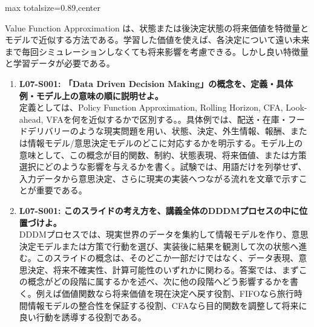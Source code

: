 \begin{minipage}[t]{0.58\textwidth}
\begin{adjustbox}{max totalsize={\textwidth}{0.89\textheight},center}
\begin{minipage}{\textwidth}
Value Function Approximation は、状態または後決定状態の将来価値を特徴量とモデルで近似する方法である。学習した価値を使えば、各決定について遠い未来まで毎回シミュレーションしなくても将来影響を考慮できる。しかし良い特徴量と学習データが必要である。\par{}\begin{enumerate}\item \textbf{L07-S001: 「Data Driven Decision Making」の概念を、定義・具体例・モデル上の意味の順に説明せよ。}\\定義としては、Policy Function Approximation, Rolling Horizon, CFA, Look-ahead, VFAを何を近似するかで区別する。。具体例では、配送・在庫・フードデリバリーのような現実問題を用い、状態、決定、外生情報、報酬、または情報モデル/意思決定モデルのどこに対応するかを明示する。モデル上の意味として、この概念が目的関数、制約、状態表現、将来価値、または方策選択にどのような影響を与えるかを書く。試験では、用語だけを列挙せず、入力データから意思決定、さらに現実の実装へつながる流れを文章で示すことが重要である。\item \textbf{L07-S001: このスライドの考え方を、講義全体のDDDMプロセスの中に位置づけよ。}\\DDDMプロセスでは、現実世界のデータを集約して情報モデルを作り、意思決定モデルまたは方策で行動を選び、実装後に結果を観測して次の状態へ進む。このスライドの概念は、そのどこか一部だけではなく、データ表現、意思決定、将来不確実性、計算可能性のいずれかに関わる。答案では、まずこの概念がどの段階に属するかを述べ、次に他の段階へどう影響するかを書く。例えば価値関数なら将来価値を現在決定へ戻す役割、FIFOなら旅行時間情報モデルの整合性を保証する役割、CFAなら目的関数を調整して将来に良い行動を誘導する役割である。\end{enumerate}
\end{minipage}
\end{adjustbox}
\end{minipage}


